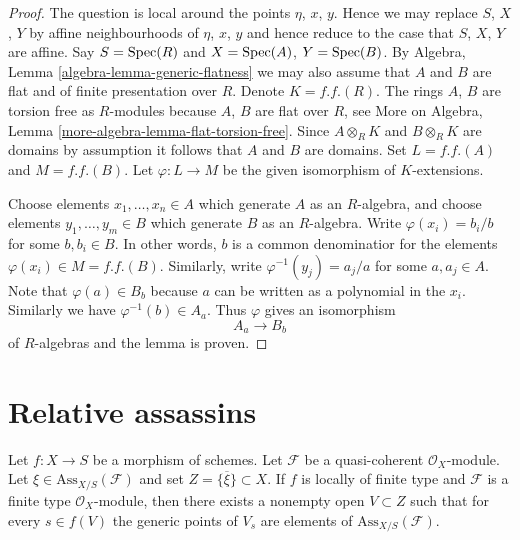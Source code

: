 \begin{proof}
The question is local around the points $\eta$, $x$, $y$. Hence we may replace
$S$, $X$, $Y$ by affine neighbourhoods of $\eta$, $x$, $y$ and hence reduce
to the case that $S$, $X$, $Y$ are affine. Say
$S = \mathop{\rm Spec}(R)$ and $X = \mathop{\rm Spec}(A)$, $Y = \mathop{\rm Spec}(B)$. By
Algebra, Lemma \ref{algebra-lemma-generic-flatness}
we may also assume that $A$ and $B$ are flat and of finite presentation
over $R$. Denote $K = f.f.(R)$. The rings $A$, $B$ are torsion free
as $R$-modules because $A$, $B$ are flat over $R$, see
More on Algebra, Lemma \ref{more-algebra-lemma-flat-torsion-free}.
Since $A \otimes_R K$ and $B \otimes_R K$ are domains by assumption it follows
that $A$ and $B$ are domains. Set $L = f.f.(A)$ and $M = f.f.(B)$.
Let $\varphi : L \to M$ be the given isomorphism of $K$-extensions.

\medskip\noindent
Choose elements $x_1, \ldots, x_n \in A$ which generate $A$ as an
$R$-algebra, and choose elements $y_1, \ldots, y_m \in B$ which generate
$B$ as an $R$-algebra. Write $\varphi(x_i) = b_i/b$ for some
$b, b_i \in B$. In other words, $b$ is a common denominatior for the
elements $\varphi(x_i) \in M = f.f.(B)$.
Similarly, write $\varphi^{-1}(y_j) = a_j/a$ for some
$a, a_j \in A$. Note that $\varphi(a) \in B_b$ because $a$ can be written
as a polynomial in the $x_i$. Similarly we have $\varphi^{-1}(b) \in A_a$.
Thus $\varphi$ gives an isomorphism
$$
A_a \longrightarrow B_b
$$
of $R$-algebras and the lemma is proven.
\end{proof}







\section{Relative assassins}
\label{section-assassin}

\begin{lemma}
\label{lemma-relative-assassin-in-neighbourhood}
Let $f : X \to S$ be a morphism of schemes.
Let $\mathcal{F}$ be a quasi-coherent $\mathcal{O}_X$-module.
Let $\xi \in \text{Ass}_{X/S}(\mathcal{F})$ and set
$Z = \overline{\{\xi\}} \subset X$.
If $f$ is locally of finite type and $\mathcal{F}$ is a
finite type $\mathcal{O}_X$-module, then there exists a nonempty
open $V \subset Z$ such that for every $s \in f(V)$ the generic
points of $V_s$ are elements of $\text{Ass}_{X/S}(\mathcal{F})$.
\end{lemma}

